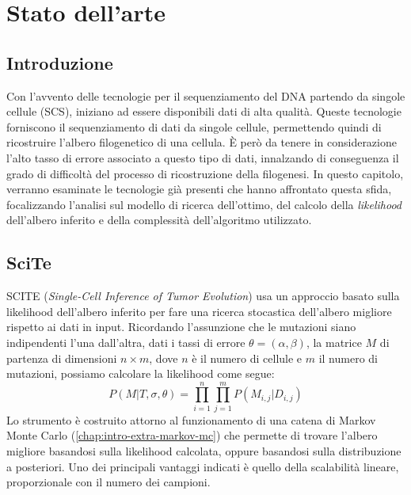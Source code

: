 
\chapter{Stato dell'arte}
\label{chap:art}


\section{Introduzione}
\label{chap:art-intro}
Con l'avvento delle tecnologie per il sequenziamento del DNA partendo da singole cellule (SCS), iniziano ad essere disponibili dati di alta qualità. Queste tecnologie forniscono il sequenziamento di dati da singole cellule, permettendo quindi di ricostruire l'albero filogenetico di una cellula. È però da tenere in considerazione l'alto tasso di errore associato a questo tipo di dati, innalzando di conseguenza il grado di difficoltà del processo di ricostruzione della filogenesi. 
In questo capitolo, verranno esaminate le tecnologie già presenti che hanno affrontato questa sfida, focalizzando l'analisi sul modello di ricerca dell'ottimo, del calcolo della \textit{likelihood} dell'albero inferito e della complessità dell'algoritmo utilizzato.


\section{SciTe \cite{scite}}
\label{chap:art-scite}
SCITE (\textit{Single-Cell Inference of Tumor Evolution}) usa un approccio basato sulla likelihood dell'albero inferito per fare una ricerca stocastica dell'albero migliore rispetto ai dati in input. Ricordando l'assunzione che le mutazioni siano indipendenti l'una dall'altra, dati i tassi di errore $\theta = (\alpha, \beta)$, la matrice $M$ di partenza di dimensioni $n \times m$, dove $n$ è il numero di cellule e $m$ il numero di mutazioni, possiamo calcolare la likelihood come segue:
\begin{equation}
  P(M | T, \sigma, \theta) = \prod_{i = 1}^{n}\prod_{j = 1}^{m} P(M_{i,j} | D_{i,j})
\end{equation}
Lo strumento è costruito attorno al funzionamento di una catena di Markov Monte Carlo (\autoref{chap:intro-extra-markov-mc}) che permette di trovare l'albero migliore basandosi sulla likelihood calcolata, oppure basandosi sulla distribuzione a posteriori. Uno dei principali vantaggi indicati è quello della scalabilità lineare, proporzionale con il numero dei campioni.

